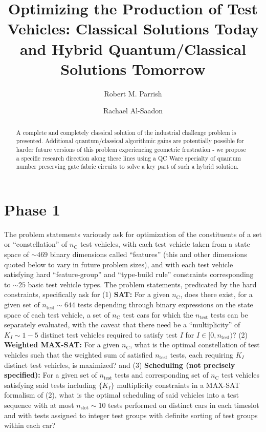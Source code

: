 \documentclass[aps,pra,twocolumn,superscriptaddress,groupedaddress]{revtex4}  %
\begin{document}

\title{
Optimizing the Production of Test Vehicles: Classical Solutions Today and Hybrid Quantum/Classical Solutions Tomorrow
}

\author{Robert M. Parrish}
\author{Rachael Al-Saadon}


\begin{abstract} 
A complete and completely classical solution of the industrial challenge problem
is presented.  Additional quantum/classical algorithmic gains are potentially
possible for harder future versions
of this problem experiencing geometric frustration - we propose a specific
research direction along these lines using a QC Ware specialty of quantum number
preserving gate fabric circuits to solve a key part of such a hybrid solution.
\end{abstract}

\maketitle

\section{Phase 1}

The problem statements variously ask for optimization of the constituents of a
set or ``constellation'' of $n_{\mathrm{C}}$ test vehicles, with each test
vehicle taken from a state space of $\sim 469$ binary dimensions called
``features'' (this and other dimensions quoted below to vary in future problem
sizes), and with each test vehicle satisfying hard ``feature-group'' and
``type-build rule'' constraints corresponding to $\sim 25$ basic test vehicle
types. The problem statements, predicated by the hard constraints,
specifically ask for (1) \textbf{SAT:} For a given $n_{\mathrm{C}}$, does there
exist, for a given set of $n_{\mathrm{test}} \sim 644$ tests depending through
binary expressions on the state space of each test vehicle, a set of
$n_{\mathrm{C}}$ test cars for which the $n_{\mathrm{test}}$ tests can be
separately evaluated, with the caveat that there need be a ``multiplicity'' of $K_I \sim 1-5$ distinct
test vehicles required to satisfy test $I$ for $I \in [0, n_{\mathrm{test}})$?
(2) \textbf{Weighted MAX-SAT:} For a given $n_{\mathrm{C}}$, what is the optimal
constellation of test vehicles such that the weighted sum of satisfied
$n_{\mathrm{test}}$ tests, each requiring $K_I$ distinct test vehicles, is
maximized? and (3) \textbf{Scheduling (not precisely specified):} For a given
set of $n_{\mathrm{test}}$ tests and corresponding set of $n_{\mathrm{C}}$ test
vehicles satisfying said tests including $\{ K_I \}$ multiplicity constraints in
a MAX-SAT formalism of (2), what is the optimal scheduling of said vehicles into
a test sequence with at most $n_{\mathrm{slot}} \sim 10$ tests performed on
distinct cars in each timeslot and with tests assigned to integer test groups
with definite sorting of test groups within each car?
\end{document}
